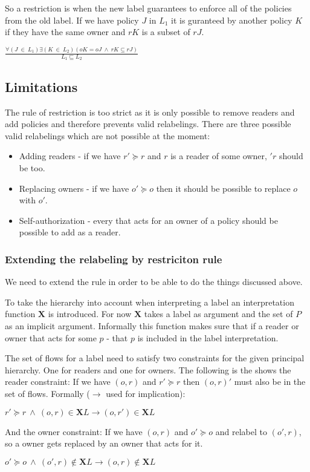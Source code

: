 So a restriction is when the new label guarantees to enforce all of the policies from the old label.
If we have policy $J$ in $L_1$ it is guranteed by another policy $K$ if they have the same owner and $rK$ is a subset of $rJ$.
\begin{definition}
$\frac{\forall (J \ \in \ L_1) \exists (K \ \in \ L_2)(oK = oJ \ \wedge \ rK \subseteq rJ)}{L_1 \sqsubseteq L_2}$
\end{definition}

\subsection{Limitations}
The rule of restriction is too strict as it is only possible to remove readers and add policies  and therefore prevents valid relabelings.
There are three possible valid relabelings which are not possible at the moment:
\begin{itemize}
\item Adding readers - if we have $r' \succeq r$ and $r$ is a reader of some owner, $'r$ should be too.
\item Replacing owners - if we have $o' \succeq o$ then it should be possible to replace $o$ with $o'$.
\item Self-authorization - every \principal{} that acts for an owner of a policy should be possible to add as a reader.
\end{itemize}

\subsubsection{Extending the relabeling by restriciton rule}
We need to extend the rule in order to be able to do the things discussed above.

To take the \principal{} hierarchy into account when interpreting a label an interpretation function $\textbf{X}$ is introduced.
For now $\textbf{X}$ takes a label as argument and the set of \principals{} $P$ as an implicit argument.
Informally this function makes sure that if a reader or owner that acts for some \principal{} $p$ - that $p$ is included in the label interpretation.


The set of flows for a label need to satisfy two constraints for the given principal hierarchy.
One for readers and one for owners.
The following is the shows the reader constraint:
If we have $(o,r)$ and $r' \succeq r$ then $(o,r)'$ must also be in the set of flows.
Formally ($\rightarrow$ used for implication):
\begin{center}
  $r' \succeq r \ \wedge \ (o,r) \in \textbf{X}L \rightarrow (o,r') \in \textbf{X}L$
\end{center}
And the owner constraint:
If we have $(o,r)$ and $o' \succeq o$ and relabel to $(o',r)$, so a owner gets replaced by an owner that acts for it.
\begin{center}
  $o' \succeq o \ \wedge \ (o',r) \notin \textbf{X}L \rightarrow (o,r) \notin \textbf{X}L$
\end{center}

